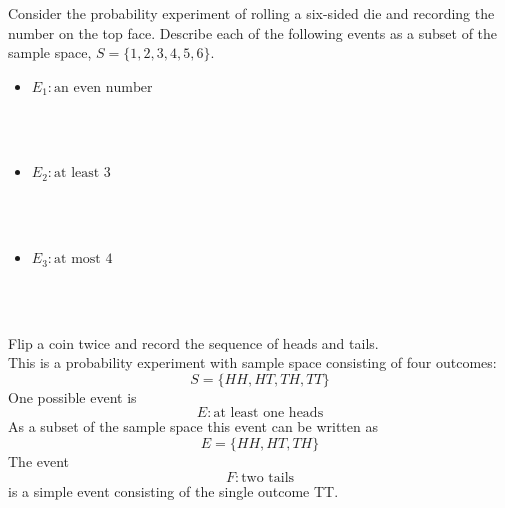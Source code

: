 \documentclass[handout]{ximera}
\begin{document}
	\begin{problem}
	Consider the probability experiment of rolling a six-sided die and recording the number on the top face. Describe each of the following events as a subset of the sample space, $S = \{1, 2, 3, 4, 5, 6\}$.\\
	\begin{itemize}
	\item $E_1: \mbox{an even number}$
	\begin{multipleChoice}
	\\
	\\
	\end{multipleChoice}
	
	\item $E_2: \mbox{at least 3}$
	\begin{multipleChoice}
	\\
	\\
	\choice[correct]{$E_2 = \{3, 4, 5, 6\}$}
	\end{multipleChoice}
	
	\item $E_3: \mbox{at most 4}$
	\begin{multipleChoice}
	\\
	\\
	\choice{$E_3 = \{1, 4\}$}
	\end{multipleChoice}
	\end{itemize}
	\end{problem}
	
	
	
	\begin{example}
	Flip a coin twice and record the sequence of heads and tails.\\
	This is a probability experiment with sample space consisting of four outcomes:
	\[
	S = \{HH, HT, TH, TT\}
	\]
	One possible event is
	\[
	E: \mbox{at least one heads}
	\]
	As a subset of the sample space this event can be written as
	\[
	E = \{HH, HT, TH\}
	\]
	The event
	\[
	F: \mbox{two tails}
	\]
	is a simple event consisting of the single outcome TT.
	
	\end{example}
	
\end{document}
